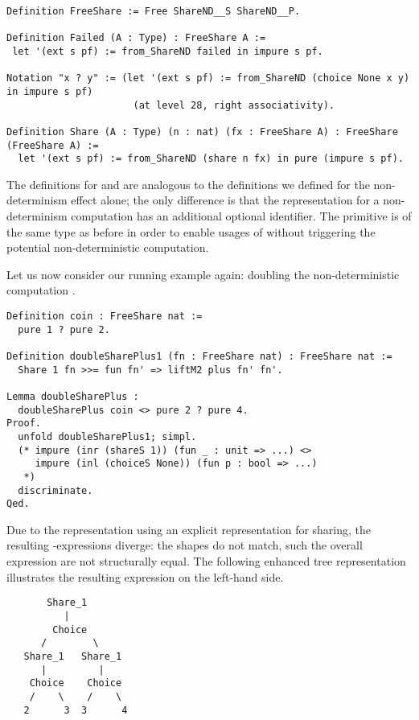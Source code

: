 \begin{verbatim}
Definition FreeShare := Free ShareND__S ShareND__P.

Definition Failed (A : Type) : FreeShare A :=
 let '(ext s pf) := from_ShareND failed in impure s pf.

Notation "x ? y" := (let '(ext s pf) := from_ShareND (choice None x y) in impure s pf)
                      (at level 28, right associativity).

Definition Share (A : Type) (n : nat) (fx : FreeShare A) : FreeShare (FreeShare A) :=
  let '(ext s pf) := from_ShareND (share n fx) in pure (impure s pf).
\end{verbatim}

The definitions for  and  are analogous to the definitions we defined for the non-determinism effect alone; the only difference is that the representation for a non-determinism computation has an additional optional identifier.
The  primitive is of the same type as before in order to enable usages of \cinl{>>=} without triggering the potential non-deterministic computation.

Let us now consider our running example again: doubling the non-deterministic computation .

\begin{verbatim}
Definition coin : FreeShare nat :=
  pure 1 ? pure 2.

Definition doubleSharePlus1 (fn : FreeShare nat) : FreeShare nat :=
  Share 1 fn >>= fun fn' => liftM2 plus fn' fn'.

Lemma doubleSharePlus :
  doubleSharePlus coin <> pure 2 ? pure 4.
Proof.
  unfold doubleSharePlus1; simpl.
  (* impure (inr (shareS 1)) (fun _ : unit => ...) <>
     impure (inl (choiceS None)) (fun p : bool => ...)
   *)
  discriminate.
Qed.
\end{verbatim}

Due to the representation using an explicit representation for sharing, the resulting -expressions diverge: the shapes do not match, such the overall expression are not structurally equal.
The following enhanced tree representation illustrates the resulting expression on the left-hand side.

\begin{verbatim}
       Share_1
          |      
        Choice
      /        \
   Share_1   Share_1
      |         |
    Choice    Choice
    /    \    /    \
   2      3  3      4
\end{verbatim}

